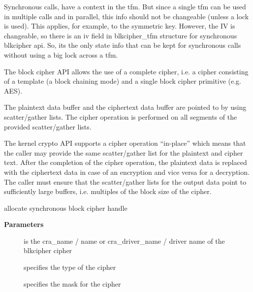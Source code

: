 \documentclass[a4paper,8pt,english]{sphinxmanual}
\begin{document}
Synchronous calls, have a context in the tfm. But since a single tfm can be
used in multiple calls and in parallel, this info should not be changeable
(unless a lock is used). This applies, for example, to the symmetric key.
However, the IV is changeable, so there is an iv field in blkcipher\_tfm
structure for synchronous blkcipher api. So, its the only state info that can
be kept for synchronous calls without using a big lock across a tfm.

The block cipher API allows the use of a complete cipher, i.e. a cipher
consisting of a template (a block chaining mode) and a single block cipher
primitive (e.g. AES).

The plaintext data buffer and the ciphertext data buffer are pointed to
by using scatter/gather lists. The cipher operation is performed
on all segments of the provided scatter/gather lists.

The kernel crypto API supports a cipher operation ``in-place'' which means that
the caller may provide the same scatter/gather list for the plaintext and
cipher text. After the completion of the cipher operation, the plaintext
data is replaced with the ciphertext data in case of an encryption and vice
versa for a decryption. The caller must ensure that the scatter/gather lists
for the output data point to sufficiently large buffers, i.e. multiples of
the block size of the cipher.

\begin{fulllineitems}
\label{crypto/api-skcipher:c.crypto_alloc_blkcipher}
allocate synchronous block cipher handle

\end{fulllineitems}


\textbf{Parameters}
\begin{description}
\item[{}] \leavevmode
is the cra\_name / name or cra\_driver\_name / driver name of the
blkcipher cipher

\item[{}] \leavevmode
specifies the type of the cipher

\item[{}] \leavevmode
specifies the mask for the cipher

\end{description}
\end{document}

